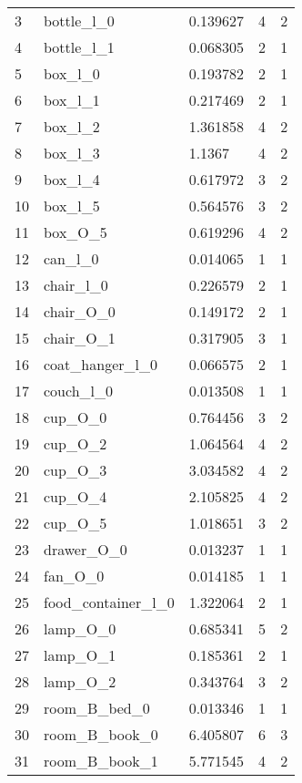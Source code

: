 \begin{longtable}{@{\zz\extracolsep{\fill}} l|llll}
3  & bottle\_l\_0             & 0.139627 & 4 & 2 \\
4  & bottle\_l\_1             & 0.068305 & 2 & 1 \\
5  & box\_l\_0                & 0.193782 & 2 & 1 \\
6  & box\_l\_1                & 0.217469 & 2 & 1 \\
7  & box\_l\_2                & 1.361858 & 4 & 2 \\
8  & box\_l\_3                & 1.1367   & 4 & 2 \\
9  & box\_l\_4                & 0.617972 & 3 & 2 \\
10 & box\_l\_5                & 0.564576 & 3 & 2 \\
11 & box\_O\_5                & 0.619296 & 4 & 2 \\
12 & can\_l\_0                & 0.014065 & 1 & 1 \\
13 & chair\_l\_0              & 0.226579 & 2 & 1 \\
14 & chair\_O\_0              & 0.149172 & 2 & 1 \\
15 & chair\_O\_1              & 0.317905 & 3 & 1 \\
16 & coat\_hanger\_l\_0       & 0.066575 & 2 & 1 \\
17 & couch\_l\_0              & 0.013508 & 1 & 1 \\
18 & cup\_O\_0                & 0.764456 & 3 & 2 \\
19 & cup\_O\_2                & 1.064564 & 4 & 2 \\
20 & cup\_O\_3                & 3.034582 & 4 & 2 \\
21 & cup\_O\_4                & 2.105825 & 4 & 2 \\
22 & cup\_O\_5                & 1.018651 & 3 & 2 \\
23 & drawer\_O\_0             & 0.013237 & 1 & 1 \\
24 & fan\_O\_0                & 0.014185 & 1 & 1 \\
25 & food\_container\_l\_0    & 1.322064 & 2 & 1 \\
26 & lamp\_O\_0               & 0.685341 & 5 & 2 \\
27 & lamp\_O\_1               & 0.185361 & 2 & 1 \\
28 & lamp\_O\_2               & 0.343764 & 3 & 2 \\
29 & room\_B\_bed\_0          & 0.013346 & 1 & 1 \\
30 & room\_B\_book\_0         & 6.405807 & 6 & 3 \\
31 & room\_B\_book\_1         & 5.771545 & 4 & 2 \\

\end{longtable}
